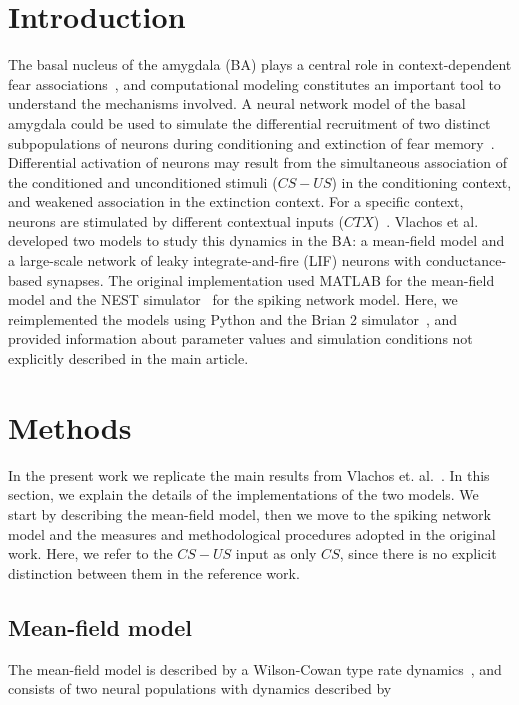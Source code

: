 
\FloatBarrier
\section*{Introduction}
The basal nucleus of the amygdala (BA) plays a central role in context-dependent fear associations~\cite{Herry2008}, and computational modeling constitutes an important tool to understand the mechanisms involved. A neural network model of the basal amygdala could be used to simulate the differential recruitment of two distinct subpopulations of neurons during conditioning and extinction of fear memory~\cite{Vlachos2011}. Differential activation of neurons may result from the simultaneous association of the conditioned and unconditioned stimuli ($CS-US$) in the conditioning context, and weakened association in the extinction context. For a specific context, neurons are stimulated by different contextual inputs ($CTX$)~\cite{Herry2008}. Vlachos et al.~\cite{Vlachos2011} developed two models to study this dynamics in the BA: a mean-field model and a large-scale network of leaky integrate-and-fire (LIF) neurons with conductance-based synapses. The original implementation used MATLAB for the mean-field model and the NEST simulator~\cite{Gewaltig:NEST} for the spiking network model. Here, we reimplemented the models using Python and the Brian 2 simulator~\cite{Stimberg2019}, and provided information about parameter values and simulation conditions not explicitly described in the main article. 

\FloatBarrier
\section*{Methods}
In the present work we replicate the main results from  Vlachos et. al.~\cite{Vlachos2011}. In this section, we explain the details of the implementations of the two models. We start by describing the mean-field model, then we move to the spiking network model and the measures and methodological procedures adopted in the original work. Here, we refer to the $CS-US$ input as only $CS$, since there is no explicit distinction between them in the reference work. 

\subsection*{Mean-field model}\label{sec:ratemodel}

The mean-field model is described by a Wilson-Cowan type rate dynamics~\cite{wilson1972excitatory}, and consists of two neural populations with dynamics described by


